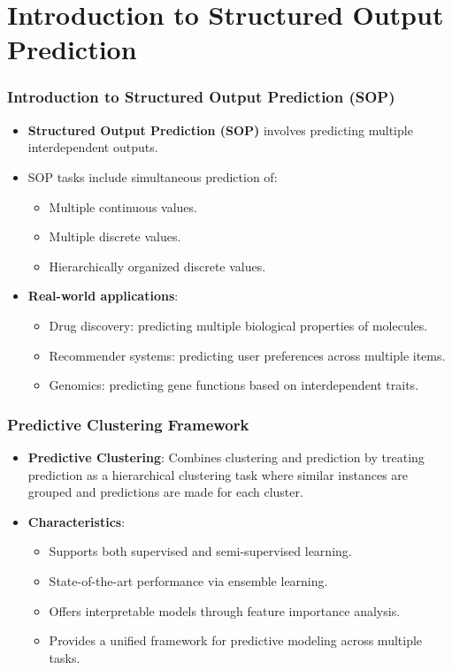 \documentclass{beamer}
\begin{document}
\section{Introduction to Structured Output Prediction}
\begin{frame}
  \frametitle{Introduction to Structured Output Prediction (SOP)}
  \begin{itemize}
    \item \textbf{Structured Output Prediction (SOP)} involves predicting multiple interdependent outputs.
    \item SOP tasks include simultaneous prediction of:
      \begin{itemize}
        \item Multiple continuous values.
        \item Multiple discrete values.
        \item Hierarchically organized discrete values.
      \end{itemize}
    \item \textbf{Real-world applications}:
      \begin{itemize}
        \item Drug discovery: predicting multiple biological properties of molecules.
        \item Recommender systems: predicting user preferences across multiple items.
        \item Genomics: predicting gene functions based on interdependent traits.
      \end{itemize}
  \end{itemize}
\end{frame}


\begin{frame}
  \frametitle{Predictive Clustering Framework}
  \begin{itemize}
    \item \textbf{Predictive Clustering}: Combines clustering and prediction by treating prediction as a hierarchical clustering task where similar instances are grouped and predictions are made for each cluster.
    \item \textbf{Characteristics}:
      \begin{itemize}
        \item Supports both supervised and semi-supervised learning.
        \item State-of-the-art performance via ensemble learning.
        \item Offers interpretable models through feature importance analysis.
        \item Provides a unified framework for predictive modeling across multiple tasks.
      \end{itemize}
  \end{itemize}
\end{frame}
\end{document}

